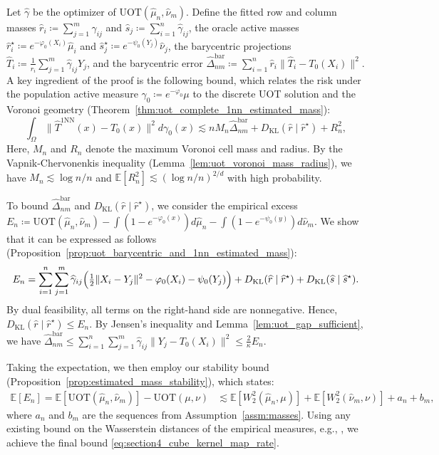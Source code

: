 \documentclass[11pt,reqno]{amsart}
\theoremstyle{definition}
\newcommand{\KL}{\mathrm{KL}}
\renewcommand{\hat}{\widehat}
\newcommand{\Ep}{\mathbb{E}}
\begin{document}
Let $\hat\gamma$ be the optimizer of $\mathrm{UOT}(\hat\mu_n,\hat\nu_m)$. Define the fitted row and column masses $\hat r_i \coloneqq \sum_{j=1}^m \hat\gamma_{ij}$ and $\hat s_j \coloneqq \sum_{i=1}^n \hat\gamma_{ij}$, the oracle active masses $\hat r^\star_i \coloneqq e^{-\varphi_0(X_i)}\hat\mu_i$ and $\hat s^\star_j \coloneqq e^{-\psi_0(Y_j)}\hat\nu_j$, the barycentric projections $\hat T_i \coloneqq \frac{1}{\hat r_i}\sum_{j=1}^m \hat\gamma_{ij}Y_j$, and the barycentric error $\hat\Delta_{nm}^{\mathrm{bar}} \coloneqq \sum_{i=1}^n \hat r_i \|\hat T_i-T_0(X_i)\|^2$. A key ingredient of the proof is the following bound, which relates the risk under the population active measure $\gamma_0 \coloneqq e^{-\varphi_0}\mu$ to the discrete UOT solution and the Voronoi geometry (Theorem~\ref{thm:uot_complete_1nn_estimated_mass}):
\begin{equation}
\int_\Omega \|\hat T^{\mathrm{1NN}}(x)-T_0(x)\|^2 d\gamma_0(x) \lesssim n M_n \hat\Delta_{nm}^{\mathrm{bar}} + {D_\KL}(\hat r\mid \hat r^\star) + R_n^2,
\end{equation}
Here, $M_n$ and $R_n$ denote the maximum Voronoi cell mass and radius. By the Vapnik-Chervonenkis inequality (Lemma~\ref{lem:uot_voronoi_mass_radius}), we have $M_n \lesssim \log n / n$ and $\Ep[R_n^2] \lesssim (\log n/n)^{2/d}$ with high probability.

To bound $\hat\Delta_{nm}^{\mathrm{bar}}$ and ${D_\KL}(\hat r\mid \hat r^\star)$, we consider the empirical excess $E_n \coloneqq \mathrm{UOT}(\hat\mu_n,\hat\nu_m) - \int (1-e^{-\varphi_0(x)}) d\hat\mu_n - \int (1-e^{-\psi_0(y)}) d\hat\nu_m$. We show that it can be expressed as follows (Proposition~\ref{prop:uot_barycentric_and_1nn_estimated_mass}):
\begin{align}
\label{eq:excess_identity_summary}
E_n = \sum_{i=1}^n\sum_{j=1}^m \hat\gamma_{ij} \Bigl( \tfrac{1}{2}\| X_i - Y_j\|^2-\varphi_0(X_i)-\psi_0(Y_j) \Bigr) + {D_\KL}(\hat r \mid \hat r^\star) + {D_\KL}(\hat s \mid \hat s^\star).
\end{align}
By dual feasibility, all terms on the right-hand side are nonnegative. Hence, ${D_\KL}(\hat r\mid \hat r^\star) \le E_n$. By Jensen's inequality and Lemma~\ref{lem:uot_gap_sufficient}, we have $\hat\Delta_{nm}^{\mathrm{bar}} \le \sum_{i=1}^n\sum_{j=1}^m \hat\gamma_{ij}\|Y_j - T_0(X_i)\|^2 \le \frac{2}{\kappa} E_n$.

Taking the expectation, we then employ our stability bound (Proposition~\ref{prop:estimated_mass_stability}), which states:
\begin{equation}
\begin{aligned}
\Ep[E_n]  = \Ep[\mathrm{UOT}(\hat\mu_n,\hat\nu_m)] - \mathrm{UOT}(\mu,\nu) &\lesssim \Ep[W_2^2(\hat\mu_n,\mu)] + \Ep[W_2^2(\hat\nu_m,\nu)] + a_n + b_m,
\end{aligned}
\end{equation}
where $a_n$ and $b_m$ are the sequences from Assumption~\ref{assm:masses}. Using any existing bound on the Wasserstein distances of the empirical measures, e.g., \cite{fournier2015rate}, we achieve the final bound \eqref{eq:section4_cube_kernel_map_rate}.
\end{document}
